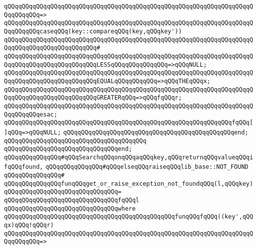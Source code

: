 \verb|qQQqqQQqqQQqqQQqqQQqqQQqqQQqqQQqqQQqqQQqqQQqqQQqqQQqqQQqqQQqqQQqqQQqqQQqqQQqqQQq=>|\newline
\verb|qQQqqQQqqQQqqQQqqQQqqQQqqQQqqQQqqQQqqQQqqQQqqQQqqQQqqQQqqQQqqQQqqQQqqQQqqQQqqQQqcaseqQQq(key::compareqQQq(key,qQQqkey'))|\newline
\verb|qQQqqQQqqQQqqQQqqQQqqQQqqQQqqQQqqQQqqQQqqQQqqQQqqQQqqQQqqQQqqQQqqQQqqQQqqQQqqQQqqQQqqQQqqQQqqQQq#|\newline
\verb|qQQqqQQqqQQqqQQqqQQqqQQqqQQqqQQqqQQqqQQqqQQqqQQqqQQqqQQqqQQqqQQqqQQqqQQqqQQqqQQqqQQqqQQqqQQqqQQqLESSqQQqqQQqqQQqqQQq=>qQQqNULL;|\newline
\verb|qQQqqQQqqQQqqQQqqQQqqQQqqQQqqQQqqQQqqQQqqQQqqQQqqQQqqQQqqQQqqQQqqQQqqQQqqQQqqQQqqQQqqQQqqQQqqQQqEQUALqQQqqQQqqQQq=>qQQqTHEqQQqx;|\newline
\verb|qQQqqQQqqQQqqQQqqQQqqQQqqQQqqQQqqQQqqQQqqQQqqQQqqQQqqQQqqQQqqQQqqQQqqQQqqQQqqQQqqQQqqQQqqQQqqQQqGREATERqQQq=>qQQqfqQQqr;|\newline
\verb|qQQqqQQqqQQqqQQqqQQqqQQqqQQqqQQqqQQqqQQqqQQqqQQqqQQqqQQqqQQqqQQqqQQqqQQqqQQqqQQqesac;|\newline
\newline
\verb|qQQqqQQqqQQqqQQqqQQqqQQqqQQqqQQqqQQqqQQqqQQqqQQqqQQqqQQqqQQqqQQqfqQQq[]qQQq=>qQQqNULL;|\newline
\verb|qQQqqQQqqQQqqQQqqQQqqQQqqQQqqQQqqQQqqQQqqQQqqQQqend;|\newline
\verb|qQQqqQQqqQQqqQQqqQQqqQQqqQQqqQQqqQQqqQQq|\newline
\verb|qQQqqQQqqQQqqQQqqQQqqQQqqQQqqQQqend;|\newline
\newline
\verb|qQQqqQQqqQQqqQQq#qQQqSearchqQQqonqQQqaqQQqkey,qQQqreturnqQQqvalueqQQqifqQQqfound,|\newline
\verb|qQQqqQQqqQQqqQQq#qQQqelseqQQqraiseqQQqlib_base::NOT_FOUND|\newline
\verb|qQQqqQQqqQQqqQQq#|\newline
\verb|qQQqqQQqqQQqqQQqfunqQQqget_or_raise_exception_not_foundqQQq(l,qQQqkey)|\newline
\verb|qQQqqQQqqQQqqQQqqQQqqQQqqQQqqQQq=|\newline
\verb|qQQqqQQqqQQqqQQqqQQqqQQqqQQqqQQqfqQQql|\newline
\verb|qQQqqQQqqQQqqQQqqQQqqQQqqQQqqQQqwhere|\newline
\verb|qQQqqQQqqQQqqQQqqQQqqQQqqQQqqQQqqQQqqQQqqQQqqQQqfunqQQqfqQQq((key',qQQqx)qQQq!qQQqr)|\newline
\verb|qQQqqQQqqQQqqQQqqQQqqQQqqQQqqQQqqQQqqQQqqQQqqQQqqQQqqQQqqQQqqQQqqQQqqQQqqQQqqQQq=>|\newline
